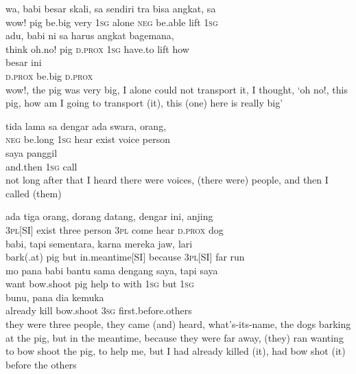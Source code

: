 \ea
\gll   wa,    {babi}    {besar}    {skali,}    {sa}    {sendiri}    {tra}    {bisa}   angkat,   sa\\
  wow!    {pig}    {be.big}    {very}    {\textsc{1sg}}    {alone}    {\textsc{neg}}    {be.able}   lift   \textsc{1sg}\\
    {adu,}    {babi}    {ni}    {sa}    {harus}    {angkat}    {bagemana,}\\
   {think}    {oh.no!}    {pig}    {\textsc{d.prox}}    {\textsc{1sg}}    {have.to}    {lift}    {how}\\
    {besar}    {ini}\\
   {\textsc{d.prox}}    {be.big}    {\textsc{d.prox}}\\
\glt
wow!, the pig was very big, I alone could not transport it, I thought, ‘oh no!, this pig, how am I going to transport (it), this (one) here is really big’
\z

\ea
\gll   tida    {lama}    {sa}   dengar   ada   swara,   orang,\\
  \textsc{neg}    {be.long}    {\textsc{1sg}}   hear   exist   voice   person\\
    {saya}    {panggil}\\
   {and.then}    {\textsc{1sg}}    {call}\\
\glt
not long after that I heard there were voices, (there were) people, and then I called (them)
\z

\ea
{}    {ada}    {tiga}    {orang,}    {dorang}    {datang,}    {dengar}    {ini,}    {anjing}\\
   {\textsc{3pl}[SI]}    {exist}    {three}    {person}    {\textsc{3pl}}    {come}    {hear}    {\textsc{d.prox}}    {dog}\\
    {babi,}    {tapi}    {sementara,}    {karna}    {mereka}    {jaw,}   lari\\
   {bark(.at)}    {pig}    {but}    {in.meantime[SI]}    {because}    {\textsc{3pl}[SI]}    {far}   run\\
\gll mo    {pana}    {babi}    {bantu}    {sama}    {dengang}    {saya,}    {tapi}    {saya}\\
  want    {bow.shoot}    {pig}    {help}    {to}    {with}    {\textsc{1sg}}    {but}    {\textsc{1sg}}\\
    {bunu,}    {pana}    {dia}    {kemuka}\\
   {already}    {kill}    {bow.shoot}    {\textsc{3sg}}    {first.before.others}\\
\glt
they were three people, they came (and) heard, what’s-its-name, the dogs barking at the pig, but in the meantime, because they were far away, (they) ran wanting to bow shoot the pig, to help me, but I had already killed (it), had bow shot (it) before the others
\z


